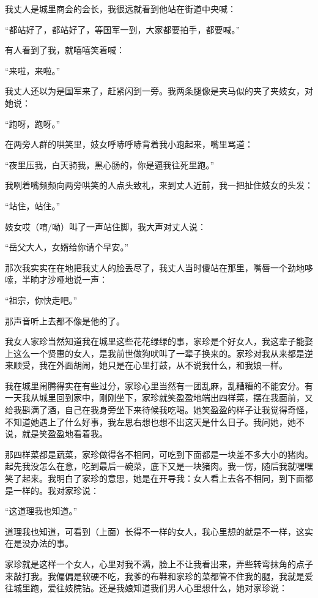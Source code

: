 \documentclass[12pt,UTF8]{ctexbook}
\begin{document}
我丈人是城里商会的会长，我很远就看到他站在街道中央喊：

“都站好了，都站好了，等国军一到，大家都要拍手，都要喊。”

有人看到了我，就嘻嘻笑着喊：

“来啦，来啦。”

我丈人还以为是国军来了，赶紧闪到一旁。我两条腿像是夹马似的夹了夹妓女，对她说：

“跑呀，跑呀。”

在两旁人群的哄笑里，妓女呼哧呼哧背着我小跑起来，嘴里骂道：

“夜里压我，白天骑我，黑心肠的，你是逼我往死里跑。”

我咧着嘴频频向两旁哄笑的人点头致礼，来到丈人近前，我一把扯住妓女的头发：

“站住，站住。”

妓女哎（唷/呦）叫了一声站住脚，我大声对丈人说：

“岳父大人，女婿给你请个早安。”

那次我实实在在地把我丈人的脸丢尽了，我丈人当时傻站在那里，嘴唇一个劲地哆嗦，半晌才沙哑地说一声：

“祖宗，你快走吧。”

那声音听上去都不像是他的了。

我女人家珍当然知道我在城里这些花花绿绿的事，家珍是个好女人，我这辈子能娶上这么一个贤惠的女人，是我前世做狗吠叫了一辈子换来的。家珍对我从来都是逆来顺受，我在外面胡闹，她只是在心里打鼓，从不说我什么，和我娘一样。

我在城里闹腾得实在有些过分，家珍心里当然有一团乱麻，乱糟糟的不能安分。有一天我从城里回到家中，刚刚坐下，家珍就笑盈盈地端出四样菜，摆在我面前，又给我斟满了酒，自己在我身旁坐下来待候我吃喝。她笑盈盈的样子让我觉得奇怪，不知道她遇上了什么好事，我左思右想也想不出这天是什么日子。我问她，她不说，就是笑盈盈地看着我。

那四样菜都是蔬菜，家珍做得各不相同，可吃到下面都是一块差不多大小的猪肉。起先我没怎么在意，吃到最后一碗菜，底下又是一块猪肉。我一愣，随后我就嘿嘿笑了起来。我明白了家珍的意思，她是在开导我：女人看上去各不相同，到下面都是一样的。我对家珍说：

“这道理我也知道。”

道理我也知道，可看到（上面）长得不一样的女人，我心里想的就是不一样，这实在是没办法的事。

家珍就是这样一个女人，心里对我不满，脸上不让我看出来，弄些转弯抹角的点子来敲打我。我偏偏是软硬不吃，我爹的布鞋和家珍的菜都管不住我的腿，我就是爱往城里跑，爱往妓院钻。还是我娘知道我们男人心里想什么，她对家珍说：
\end{document}
